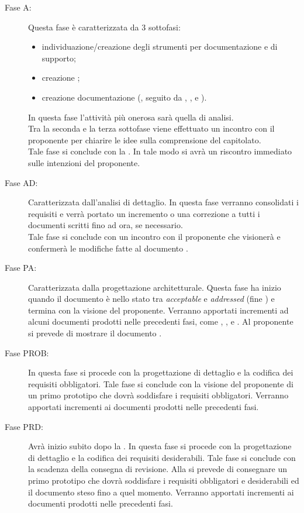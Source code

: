 		\begin{description}
			\item[Fase A:] Questa fase è caratterizzata da 3 sottofasi:
				\begin{itemize}
					\item individuazione/creazione degli strumenti per documentazione e di supporto;
					\item creazione ;
					\item creazione documentazione (, seguito da , ,  e ).
				\end{itemize}
				In questa fase l'attività più onerosa sarà quella di analisi.\\Tra la seconda e la terza sottofase viene effettuato un incontro con il proponente per chiarire le idee sulla comprensione del capitolato.\\Tale fase si conclude con la . In tale modo si avrà un riscontro immediato sulle intenzioni del proponente.
			\item[Fase AD:] Caratterizzata dall’analisi di dettaglio. In questa fase verranno consolidati i requisiti  e verrà portato un incremento o una correzione a tutti i documenti scritti fino ad ora, se necessario.\\Tale fase si conclude con un incontro con il proponente che visionerà e confermerà le modifiche fatte al documento .
			\item[Fase PA:] Caratterizzata dalla progettazione architetturale. Questa fase ha inizio quando il documento  è nello stato tra \textit{acceptable} e \textit{addressed} (fine ) e termina con la visione del proponente. Verranno apportati incrementi ad alcuni documenti prodotti nelle precedenti fasi, come , ,  e . Al proponente si prevede di mostrare il documento .
			\item[Fase PROB:] In questa fase si procede con la progettazione di dettaglio e la codifica dei requisiti obbligatori. Tale fase si conclude con la visione del proponente di un primo prototipo che dovrà soddisfare i requisiti obbligatori. Verranno apportati incrementi ai documenti prodotti nelle precedenti fasi.
			\item[Fase PRD:] Avrà inizio subito dopo la . In questa fase si procede con la progettazione di dettaglio e la codifica dei requisiti desiderabili. Tale fase si conclude con la scadenza della consegna di revisione. Alla  si prevede di consegnare un primo prototipo che dovrà soddisfare i requisiti obbligatori e desiderabili ed il documento  steso fino a quel momento. Verranno apportati incrementi ai documenti prodotti nelle precedenti fasi.

\end{description}
